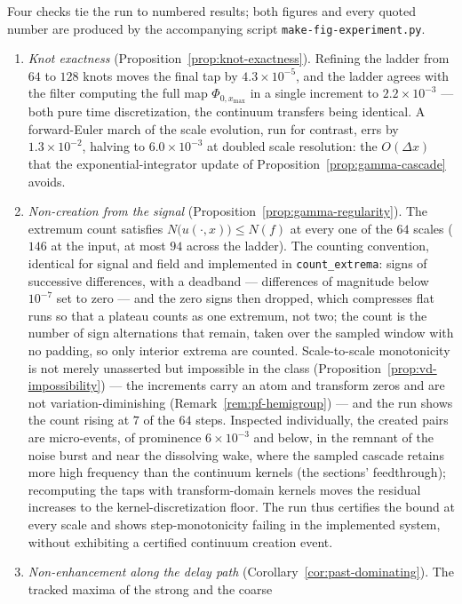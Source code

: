 \begin{example}
Four checks tie the run to numbered results; both figures and every quoted number are
produced by the accompanying script \texttt{make-fig-experiment.py}.
\begin{enumerate}
\item \emph{Knot exactness} (Proposition~\ref{prop:knot-exactness}). Refining the ladder
from $64$ to $128$ knots moves the final tap by $4.3 \times 10^{-5}$, and the ladder
agrees with the filter computing the full map $\Phi_{0, x_{\max}}$ in a single increment
to $2.2 \times 10^{-3}$ --- both pure time discretization, the continuum transfers being
identical. A forward-Euler march of the scale evolution, run for contrast, errs by
$1.3 \times 10^{-2}$, halving to $6.0 \times 10^{-3}$ at doubled scale resolution: the
$O(\Delta x)$ that the exponential-integrator update of
Proposition~\ref{prop:gamma-cascade} avoids.
\item \emph{Non-creation from the signal} (Proposition~\ref{prop:gamma-regularity}). The
extremum count satisfies $N\bigl(u(\cdot, x)\bigr) \le N(f)$ at every one of the $64$
scales ($146$ at the input, at most $94$ across the ladder). The counting convention,
identical for signal and field and implemented in \texttt{count\_extrema}: signs of
successive differences, with a deadband --- differences of magnitude below $10^{-7}$ set
to zero --- and the zero signs then dropped, which compresses flat runs so that a plateau
counts as one extremum, not two; the count is the number of sign alternations that
remain, taken over the sampled window with no padding, so only interior extrema are
counted. Scale-to-scale monotonicity
is not merely unasserted but impossible in the class
(Proposition~\ref{prop:vd-impossibility}) --- the increments carry an atom and transform
zeros and are not variation-diminishing (Remark~\ref{rem:pf-hemigroup}) --- and the run
shows the count rising at $7$ of the $64$ steps. Inspected individually, the created
pairs are micro-events, of prominence $6 \times 10^{-3}$ and below, in the remnant of
the noise burst and near the dissolving wake, where the sampled cascade retains more
high frequency than the continuum kernels (the sections' feedthrough); recomputing the
taps with transform-domain kernels moves the residual increases to the
kernel-discretization floor. The run thus certifies the bound at every scale and shows
step-monotonicity failing in the implemented system, without exhibiting a certified
continuum creation event.
\item \emph{Non-enhancement along the delay path}
(Corollary~\ref{cor:past-dominating}). The tracked maxima of the strong and the coarse

\end{enumerate}
\end{example}
